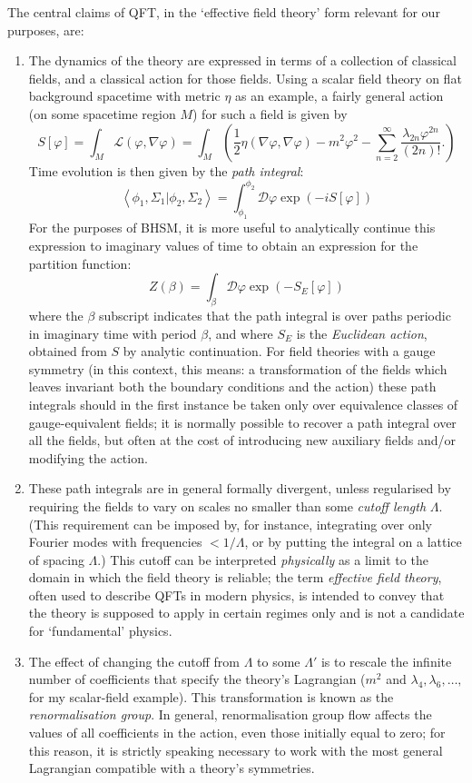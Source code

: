 \documentclass{article}
\newcommand{\mc}[1]{\ensuremath{\mathcal{#1}}}
\newcommand{\bk}[2]{\ensuremath{\left\langle #1 | #2 \right\rangle}}
\newcommand{\be}{\begin{equation}}
\newcommand{\ee}{\end{equation}}
\begin{document}
The central claims of QFT, in the `effective field theory' form relevant for our purposes, are:
\begin{enumerate}
\item The dynamics of the theory are expressed in terms of a collection of classical fields, and a classical action for those fields. Using a scalar field theory on flat background spacetime with metric $\eta$ as an example, a fairly general action (on some spacetime region $M$) for such a field is given by 
\be
S[\varphi] = \int_M \mc{L}(\varphi, \nabla \varphi) = \int_M \left(\frac{1}{2}\eta (\nabla \varphi,\nabla \varphi) - m^2 \varphi^2 - \sum_{n=2}^\infty \frac{\lambda_{2n}\varphi^{2n}}{(2n)!}. \right)
\ee
Time evolution is then given by the \emph{path integral}:
\be \label{pathintegral}
\bk{\phi_1,\Sigma_1}{\phi_2,\Sigma_2} = \int^{\phi_2}_{\phi_1} \mc{D}\varphi \exp (-i S[\varphi])
\ee
For the purposes of BHSM, it is more useful to analytically continue this expression to imaginary values of time to obtain an expression for the partition function:
\be
Z(\beta) = \int_\beta \mc{D}\varphi \exp (-S_E[\varphi])
\ee
where the $\beta$ subscript indicates that the path integral is over paths periodic in imaginary time with period $\beta$, and where $S_E$ is the \emph{Euclidean action}, obtained from $S$ by analytic continuation. For field theories with a gauge symmetry (in this context, this means: a transformation of the fields which leaves invariant both the boundary conditions and the action) these path integrals should in the first instance be taken only over equivalence classes of gauge-equivalent fields; it is normally possible to recover a path integral over all the fields, but often at the cost of introducing new auxiliary fields and/or modifying the action.
\item These path integrals are in general formally divergent, unless regularised by requiring the fields to vary on scales no smaller than some \emph{cutoff length} $\Lambda$. (This requirement can be imposed by, for instance, integrating over only Fourier modes with frequencies $<1/\Lambda$, or by putting the integral on a lattice of spacing $\Lambda$.) This cutoff can be interpreted \emph{physically} as a limit to the domain in which the field theory is reliable; the term \emph{effective field theory}, often used to describe QFTs in modern physics, is intended to convey that the theory is supposed to apply in certain regimes only and is not a candidate for `fundamental' physics. 
\item The effect of changing the cutoff from $\Lambda$ to some $\Lambda'$ is to rescale the infinite number of coefficients that specify the theory's Lagrangian ($m^2$ and $\lambda_4, \lambda_6, \ldots,$ for my scalar-field example). This transformation is known as the \emph{renormalisation group}. In general, renormalisation group flow affects the values of all coefficients in the action, even those initially equal to zero; for this reason, it is strictly speaking necessary to work with the most general Lagrangian compatible with a theory's symmetries. 

\end{enumerate}
\end{document}
